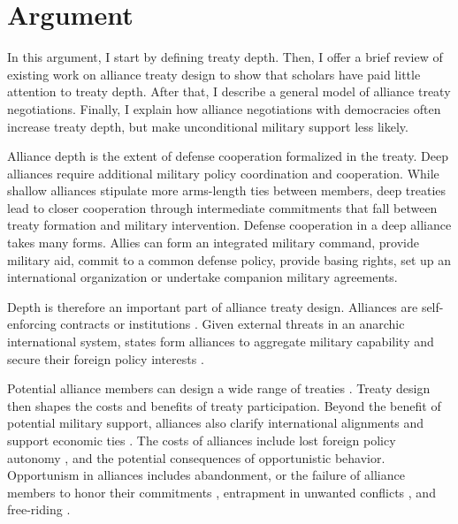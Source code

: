 \documentclass[12pt]{article}
\begin{document}
\section{Argument}


In this argument, I start by defining treaty depth. 
Then, I offer a brief review of existing work on alliance treaty design to show that scholars have paid little attention to treaty depth.  
After that, I describe a general model of alliance treaty negotiations. 
Finally, I explain how alliance negotiations with democracies often increase treaty depth, but make unconditional military support less likely. 


Alliance depth is the extent of defense cooperation formalized in the treaty. 
Deep alliances require additional military policy coordination and cooperation. 
While shallow alliances stipulate more arms-length ties between members, deep treaties lead to closer cooperation through intermediate commitments that fall between treaty formation and military intervention. 
Defense cooperation in a deep alliance takes many forms. 
Allies can form an integrated military command, provide military aid, commit to a common defense policy, provide basing rights, set up an international organization or undertake companion military agreements. 


Depth is therefore an important part of alliance treaty design.
Alliances are self-enforcing contracts or institutions \citep{Leedsetal2002, Morrow2000}.
Given external threats in an anarchic international system, states form alliances to aggregate military capability and secure their foreign policy interests \citep{Altfield1984, Smith1995, Snyder1997, FordhamPoast2014}. 


Potential alliance members can design a wide range of treaties \citep{Leedsetal2000, Leedsetal2002, Benson2012, BensonClinton2016}. 
Treaty design then shapes the costs and benefits of treaty participation. 
Beyond the benefit of potential military support, alliances also clarify international alignments \citep{Snyder1990} and support economic ties \citep{Gowa1995, Li2003, Long2003, Fordham2010, WolfordKim2017}. 
The costs of alliances include lost foreign policy autonomy \citep{Altfield1984, Morrow2000, Johnson2015}, and the potential consequences of opportunistic behavior. 
Opportunism in alliances includes abandonment, or the failure of alliance members to honor their commitments \citep{Leeds2003a, BerkemeierFuhrmann2018}, entrapment in unwanted conflicts \citep{Snyder1984}, and free-riding \citep{Morrow2000}.   
\end{document}
